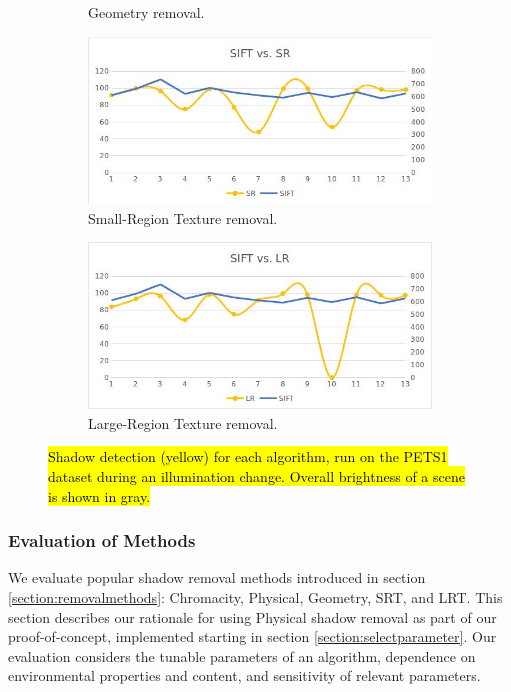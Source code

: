 \begin{figure}
\begin{subfigure}{.49\linewidth}
  \caption{Geometry removal.}
\end{subfigure}
\hfill
\begin{subfigure}{.49\linewidth}
  \includegraphics[width=1\linewidth]{figures/selectinganalgorithm_srt.jpg}
  \caption{Small-Region Texture removal.}
\end{subfigure}
\hfill
\begin{subfigure}{.49\linewidth}
  \includegraphics[width=1\linewidth]{figures/selectinganalgorithm_lrt.jpg}
  \caption{Large-Region Texture removal.}
\end{subfigure}

\caption{\hl{Shadow detection (yellow) for each algorithm, run on the PETS1 dataset during an illumination change. Overall brightness of a scene is shown in gray.}}
\label{fig:selectinganalgorithm}
\end{figure}

\subsubsection{Evaluation of Methods}

We evaluate popular shadow removal methods introduced in section \ref{section:removalmethods}: Chromacity, Physical, Geometry, SRT, and LRT. This section describes our rationale for using Physical shadow removal as part of our proof-of-concept, implemented starting in section \ref{section:selectparameter}. Our evaluation considers the tunable parameters of an algorithm, dependence on environmental properties and content, and sensitivity of relevant parameters.

